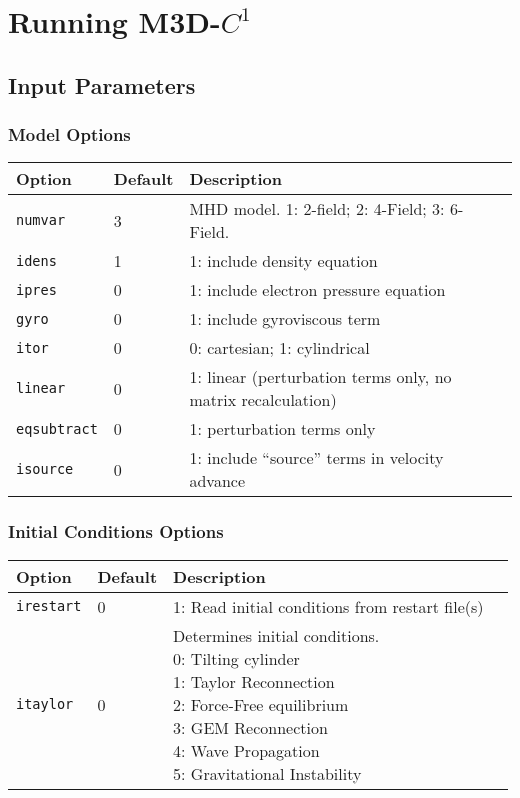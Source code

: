 \documentclass[draft]{book}
\newcommand{\codename}{M3D-$C^1$}
\begin{document}
\chapter{Running \codename}

\section{Input Parameters}

\subsection{Model Options}

\begin{tabular}{llll}
  \textbf{Option}&\textbf{Default}&\textbf{Description}\\
  \hline
  \texttt{numvar} & 3   & MHD model. 1: 2-field;  2: 4-Field;  3: 6-Field.\\
  \texttt{idens}  & 1   & 1: include density equation\\
  \texttt{ipres}  & 0   & 1: include electron pressure equation\\
  \texttt{gyro}   & 0   & 1: include gyroviscous term\\
  \texttt{itor}   & 0   & 0: cartesian; 1: cylindrical\\
  \texttt{linear} & 0   & \parbox[t]{3in}{1: linear (perturbation terms only,
    no matrix  recalculation)}\\
  \texttt{eqsubtract}& 0& 1: perturbation terms only\\
  \texttt{isource}   & 0& 1: include ``source'' terms in velocity
    advance\\
\end{tabular}


\subsection{Initial Conditions Options}

\begin{tabular}{llll}
  \textbf{Option}&\textbf{Default}&\textbf{Description}\\
  \hline
  \texttt{irestart} & 0 & 1: Read initial conditions from restart file(s)\\
  \texttt{itaylor}  & 0 & \parbox[t]{2in}{Determines initial
  conditions.\\
  0: Tilting cylinder\\
  1: Taylor Reconnection\\
  2: Force-Free equilibrium\\
  3: GEM Reconnection\\
  4: Wave Propagation\\
  5: Gravitational Instability\\}
\end{tabular}
\end{document}
